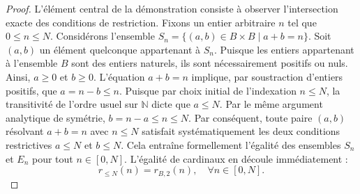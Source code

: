 \documentclass[12pt,a4paper]{article}
\begin{document}
\begin{proof}
L'\'el\'ement central de la d\'emonstration consiste \`a observer l'intersection exacte des conditions de restriction.
Fixons un entier arbitraire $n$ tel que $0 \le n \le N$.
Consid\'erons l'ensemble $S_n = \{ (a,b) \in B \times B \mid a+b = n \}$. Soit $(a,b)$ un \'el\'ement quelconque appartenant \`a $S_n$. Puisque les entiers appartenant \`a l'ensemble $B$ sont des entiers naturels, ils sont n\'ecessairement positifs ou nuls. Ainsi, $a \ge 0$ et $b \ge 0$.
L'\'equation $a+b=n$ implique, par soustraction d'entiers positifs, que $a = n - b \le n$. Puisque par choix initial de l'indexation $n \le N$, la transitivit\'e de l'ordre usuel sur $\mathbb{N}$ dicte que $a \le N$. Par le m\^eme argument analytique de sym\'etrie, $b = n - a \le n \le N$.
Par cons\'equent, toute paire $(a,b)$ r\'esolvant $a+b=n$ avec $n \le N$ satisfait syst\'ematiquement les deux conditions restrictives $a \le N$ et $b \le N$.
Cela entra\^ine formellement l'\'egalit\'e des ensembles $S_n$ et $E_n$ pour tout $n \in [0, N]$. L'\'egalit\'e de cardinaux en d\'ecoule imm\'ediatement :
\begin{equation}
r_{\le N}(n) = r_{B,2}(n), \quad \forall n \in [0, N].
\end{equation}


\end{proof}
\end{document}
